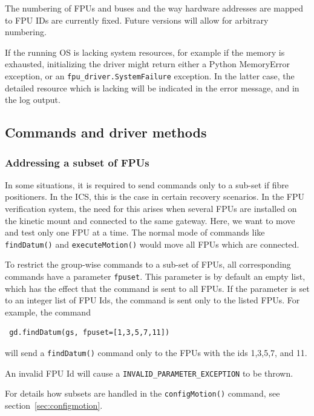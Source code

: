 \documentclass[11pt,a4paper]{scrartcl}
\begin{document}
The numbering of FPUs and buses and the way hardware addresses are
mapped to FPU IDs are currently fixed. Future versions will allow for
arbitrary numbering.

\begin{sloppypar}
If the running OS is lacking system resources, for example if the
memory is exhausted, initializing the driver might return either a
Python MemoryError exception, or an
\texttt{fpu\_driver.SystemFailure} exception. In the latter case,
the detailed resource which is lacking will be indicated in the error
message, and in the log output.
\end{sloppypar}




\subsection{Commands and driver methods}
\label{sec:commands}

\subsubsection{Addressing a subset of FPUs}
\label{sec:subsets}
 In some situations, it is required
to send commands only to a sub-set if fibre positioners. In the ICS,
this is the case in certain recovery scenarios.  In the FPU
verification system, the need for this arises when several FPUs are
installed on the kinetic mount and connected to the same
gateway. Here, we want to move and test only one FPU at a time. The
normal mode of commands like \texttt{findDatum()} and
\texttt{executeMotion()} would move all FPUs which are connected.

To restrict the group-wise commands to a sub-set of FPUs, all
corresponding commands have a parameter \texttt{fpuset}.  This
parameter is by default an empty list, which has the effect that the
command is sent to all FPUs. If the parameter is set to an integer
list of FPU Ids, the command is sent only to the listed FPUs.
For example, the command

\begin{verbatim}
 gd.findDatum(gs, fpuset=[1,3,5,7,11])
\end{verbatim}
will send a \texttt{findDatum()} command only to the FPUs with the ids
1,3,5,7, and 11.

An invalid FPU Id will cause a \texttt{INVALID\_PARAMETER\_EXCEPTION}
to be thrown.

For details how subsets are handled in the \texttt{configMotion()}
command, see section~\ref{sec:configmotion}.
\end{document}
